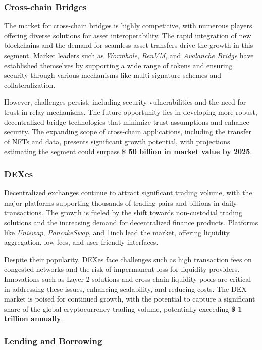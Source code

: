 \documentclass[12pt, a4paper]{article}
\begin{document}
\subsubsection{Cross-chain Bridges}

The market for cross-chain bridges is highly competitive, with numerous players offering diverse solutions for asset interoperability. The rapid integration of new blockchains and the demand for seamless asset transfers drive the growth in this segment. Market leaders such as \textit{Wormhole}, \textit{RenVM}, and \textit{Avalanche Bridge} have established themselves by supporting a wide range of tokens and ensuring security through various mechanisms like multi-signature schemes and collateralization.

However, challenges persist, including security vulnerabilities and the need for trust in relay mechanisms. The future opportunity lies in developing more robust, decentralized bridge technologies that minimize trust assumptions and enhance security. The expanding scope of cross-chain applications, including the transfer of NFTs and data, presents significant growth potential, with projections estimating the segment could surpass \textbf{\$ 50 billion in market value by 2025}.

\subsubsection{DEXes}

Decentralized exchanges continue to attract significant trading volume, with the major platforms supporting thousands of trading pairs and billions in daily transactions. The growth is fueled by the shift towards non-custodial trading solutions and the increasing demand for decentralized finance products. Platforms like \textit{Uniswap}, \textit{PancakeSwap}, and 1inch lead the market, offering liquidity aggregation, low fees, and user-friendly interfaces.

Despite their popularity, DEXes face challenges such as high transaction fees on congested networks and the risk of impermanent loss for liquidity providers. Innovations such as Layer 2 solutions and cross-chain liquidity pools are critical in addressing these issues, enhancing scalability, and reducing costs. The DEX market is poised for continued growth, with the potential to capture a significant share of the global cryptocurrency trading volume, potentially exceeding \textbf{\$ 1 trillion annually}.

\subsubsection{Lending and Borrowing}
\end{document}
